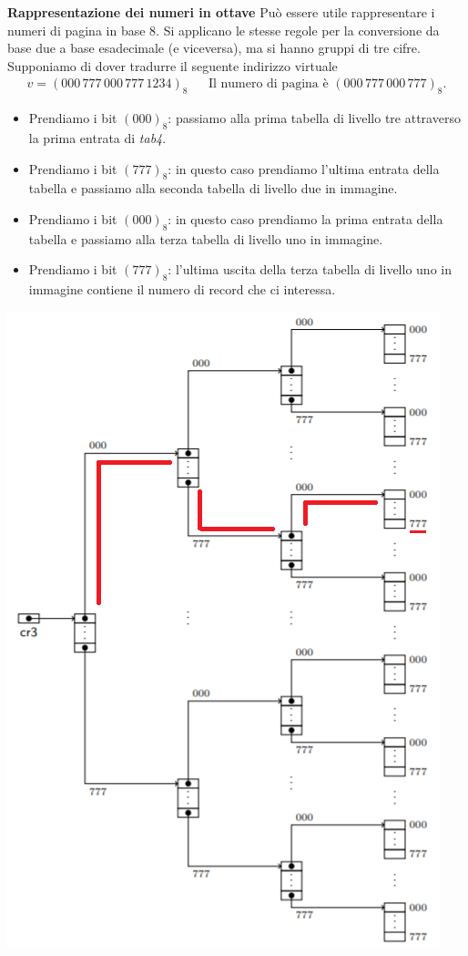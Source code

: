 \documentclass[11pt]{report}
\theoremstyle{definition}
\begin{document}
\clearpage 
\begin{framed}
\noindent \textbf{Rappresentazione dei numeri in ottave} Può essere utile rappresentare i numeri di pagina in base 8. Si applicano le stesse regole per la conversione da base due a base esadecimale (e viceversa), ma si hanno gruppi di tre cifre. Supponiamo di dover tradurre il seguente indirizzo virtuale
\begin{align*}v=\left(000\,777\,000\,777\,1234\right)_8&&\text{Il numero di pagina è $\left(000\,777\,000\,777\right)_8$.}\end{align*}
\begin{itemize}
	\item Prendiamo i bit $(000)_8$: passiamo alla prima tabella di livello tre attraverso la prima entrata di \emph{tab4}. 
	\item Prendiamo i bit $(777)_8$: in questo caso prendiamo l'ultima entrata della tabella e passiamo alla seconda tabella di livello due in immagine.
	\item Prendiamo i bit $(000)_8$: in questo caso prendiamo la prima entrata della tabella e passiamo alla terza tabella di livello uno in immagine.
	\item Prendiamo i bit $(777)_8$: l'ultima uscita della terza tabella di livello uno  in immagine contiene il numero di record che ci interessa.
\end{itemize}

\begin{center}
	\includegraphics[scale=.8]{img/232.PNG}
\end{center}
\end{framed} 
\clearpage 
\end{document}
